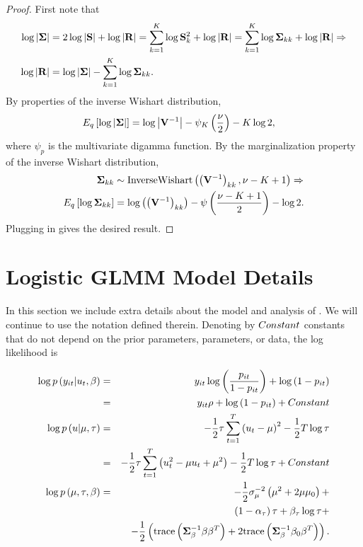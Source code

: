\documentclass{article}\usepackage[]{graphicx}\usepackage[]{color}
\theoremstyle{plain}
\theoremstyle{definition}
\theoremstyle{plain}
\theoremstyle{plain}
\theoremstyle{plain}
\theoremstyle{plain}
\begin{document}
\begin{proof}
First note that
\begin{align*}
\log\left|\boldsymbol{\Sigma}\right| & =2\log\left|\mathbf{S}\right|+\log\left|\mathbf{R}\right|=\sum_{k=1}^{K}\log\mathbf{S}_{k}^{2}+\log\left|\mathbf{R}\right|=\sum_{k=1}^{K}\log\boldsymbol{\Sigma}_{kk}+\log\left|\mathbf{R}\right|\Rightarrow\\
\log\left|\mathbf{R}\right| & =\log\left|\boldsymbol{\Sigma}\right|-\sum_{k=1}^{K}\log\boldsymbol{\Sigma}_{kk}.
\end{align*}
By properties of the inverse Wishart distribution,
\begin{align*}
E_{q}\left[\log\left|\boldsymbol{\Sigma}\right|\right] & =\log\left|\mathbf{V}^{-1}\right|-\psi_{K}\left(\frac{\nu}{2}\right)-K\log2,
\end{align*}
where $\psi_{p}$ is the multivariate digamma function. By the marginalization
property of the inverse Wishart distribution,
\begin{align*}
\boldsymbol{\Sigma}_{kk} & \sim\textrm{InverseWishart}\left(\left(\mathbf{V}^{-1}\right)_{kk},\nu-K+1\right)\Rightarrow\\
E_{q}\left[\log\boldsymbol{\Sigma}_{kk}\right] & =\log\left(\left(\mathbf{V}^{-1}\right)_{kk}\right)-\psi\left(\frac{\nu-K+1}{2}\right)-\log2.
\end{align*}
Plugging in gives the desired result.
\end{proof}

\section{Logistic GLMM Model Details\label{app:glmm_details}}

In this section we include extra details about the model and analysis
of . We will continue to use the notation
defined therein. Denoting by $Constant$ constants that do not depend
on the prior parameters, parameters, or data, the log likelihood is

\begin{eqnarray*}
\log p\left(y_{it}\vert u_{t},\beta\right) & = & y_{it}\log\left(\frac{p_{it}}{1-p_{it}}\right)+\log\left(1-p_{it}\right)\\
 & = & y_{it}\rho+\log\left(1-p_{it}\right)+Constant\\
\log p\left(u\vert\mu,\tau\right) & = & -\frac{1}{2}\tau\sum_{t=1}^{T}\left(u_{t}-\mu\right)^{2}-\frac{1}{2}T\log\tau\\
 & = & -\frac{1}{2}\tau\sum_{t=1}^{T}\left(u_{t}^{2}-\mu u_{t}+\mu^{2}\right)-\frac{1}{2}T\log\tau+Constant\\
\log p\left(\mu,\tau,\beta\right) & = & -\frac{1}{2}\sigma_{\mu}^{-2}\left(\mu^{2}+2\mu\mu_{0}\right)+\\
 &  & \left(1-\alpha_{\tau}\right)\tau+\beta_{\tau}\log\tau+\\
 &  & -\frac{1}{2}\left(\textrm{trace}\left(\boldsymbol{\Sigma}_{\beta}^{-1}\beta\beta^{T}\right)+2\textrm{trace}\left(\boldsymbol{\Sigma}_{\beta}^{-1}\beta_{0}\beta^{T}\right)\right).
\end{eqnarray*}
\end{document}
